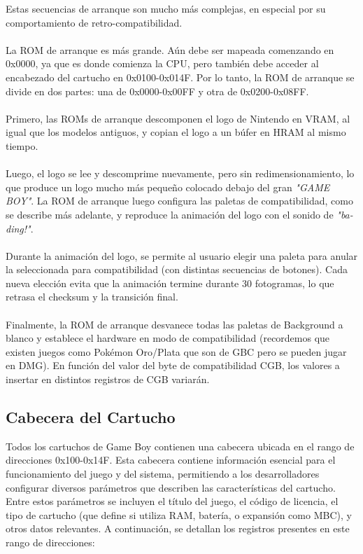 Estas secuencias de arranque son mucho más complejas, en especial por su comportamiento de retro-compatibilidad.
\\\\
La ROM de arranque es más grande. Aún debe ser mapeada comenzando en 0x0000, ya que es donde comienza la CPU, pero también debe acceder al encabezado del cartucho en 0x0100-0x014F. Por lo tanto, la ROM de arranque se divide en dos partes: una de 0x0000-0x00FF y otra de 0x0200-0x08FF.
\\\\
Primero, las ROMs de arranque descomponen el logo de Nintendo en VRAM, al igual que los modelos antiguos, y copian el logo a un búfer en HRAM al mismo tiempo.
\\\\
Luego, el logo se lee y descomprime nuevamente, pero sin redimensionamiento, lo que produce un logo mucho más pequeño colocado debajo del gran \textit{"GAME BOY"}. La ROM de arranque luego configura las paletas de compatibilidad, como se describe más adelante, y reproduce la animación del logo con el sonido de \textit{"ba-ding!"}.
\\\\
Durante la animación del logo, se permite al usuario elegir una paleta para anular la seleccionada para compatibilidad (con distintas secuencias de botones). Cada nueva elección evita que la animación termine durante 30 fotogramas, lo que retrasa el checksum y la transición final.
\\\\
Finalmente, la ROM de arranque desvanece todas las paletas de Background a blanco y establece el hardware en modo de compatibilidad (recordemos que existen juegos como Pokémon Oro/Plata que son de GBC pero se pueden jugar en DMG). En función del valor del byte de compatibilidad CGB, los valores a insertar en distintos registros de CGB variarán.

\subsection{Cabecera del Cartucho}

Todos los cartuchos de Game Boy contienen una cabecera ubicada en el rango de direcciones 0x100-0x14F. Esta cabecera contiene información esencial para el funcionamiento del juego y del sistema, permitiendo a los desarrolladores configurar diversos parámetros que describen las características del cartucho. Entre estos parámetros se incluyen el título del juego, el código de licencia, el tipo de cartucho (que define si utiliza RAM, batería, o expansión como MBC), y otros datos relevantes. A continuación, se detallan los registros presentes en este rango de direcciones:

